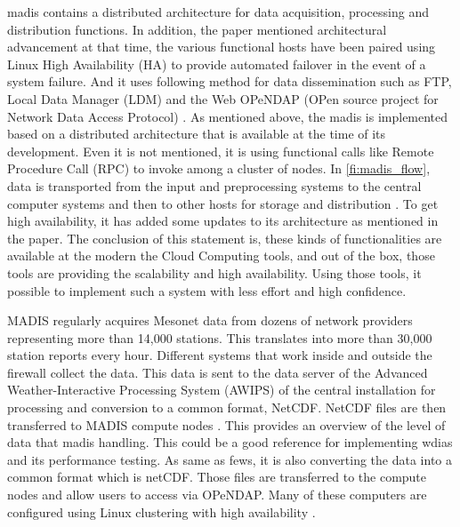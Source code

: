 \acrshort{madis} contains a distributed architecture for data acquisition, processing and distribution functions.
In addition, the paper mentioned architectural advancement at that time, the various functional hosts have been paired using Linux High Availability (HA) to provide automated failover in the event of a system failure. And it uses following method for data dissemination such as FTP, Local Data Manager (LDM) and the Web OPeNDAP (OPen source project for Network Data Access Protocol) \cite{Macdermaid2005ArchitectureP2.39}. As mentioned above, the \acrshort{madis} is implemented based on a distributed architecture that is available at the time of its development. Even it is not mentioned, it is using functional calls like Remote Procedure Call (RPC) to invoke among a cluster of nodes. In \cref{fi:madis_flow}, data is transported from the input and preprocessing systems to the central computer systems and then to other hosts for storage and distribution \cite{Macdermaid2005ArchitectureP2.39}. To get high availability, it has added some updates to its architecture as mentioned in the paper. The conclusion of this statement is, these kinds of functionalities are available at the modern the Cloud Computing tools, and out of the box, those tools are providing the scalability and high availability. Using those tools, it possible to implement such a system with less effort and high confidence.

MADIS regularly acquires Mesonet data from dozens of network providers representing more than 14,000 stations. This translates into more than 30,000 station reports every hour. Different systems that work inside and outside the firewall collect the data. This data is sent to the data server of the Advanced Weather-Interactive Processing System (AWIPS) of the central installation for processing and conversion to a common format, NetCDF. NetCDF files are then transferred to MADIS compute nodes \cite{Macdermaid2005ArchitectureP2.39}. This provides an overview of the level of data that \acrshort{madis} handling. This could be a good reference for implementing \acrshort{wdias} and its performance testing. As same as \acrshort{fews}, it is also converting the data into a common format which is \acrshort{netCDF}. Those files are transferred to the compute nodes and allow users to access via OPeNDAP. 
Many of these computers are configured using Linux clustering with high availability \cite{Macdermaid2005ArchitectureP2.39}.%

